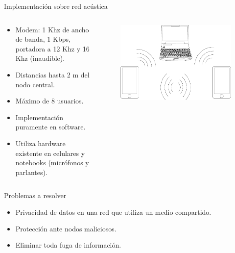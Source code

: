 \documentclass[aspectratio=169]{beamer}
\begin{document}
\begin{frame}{Implementación sobre red \color{red}acústica}

\begin{columns}
  \begin{column}{0.50\textwidth}

\begin{itemize}
 \item Modem: 1 Khz de ancho de banda, 1 Kbps, portadora a 12 Khz y 16 Khz (inaudible).
 \item Distancias hasta 2 m del nodo central.
 \item Máximo de 8 usuarios.
 \item Implementación puramente en software.
 \item Utiliza hardware existente en celulares y notebooks (micrófonos y parlantes).
 \end{itemize}

  \end{column}
  \begin{column}{0.50\textwidth}

 
\begin{figure}[t]
  \centering
  \includegraphics[width=0.85 \textwidth]{../graphs/compucelus.pdf}
\end{figure}

  \end{column}
\end{columns}

\end{frame}




\begin{frame}{Problemas a resolver}

\begin{itemize}
 \item Privacidad de datos en una red que utiliza un medio compartido.
 \item Protección ante nodos maliciosos. 
 \item Eliminar toda fuga de información.
 \end{itemize}
\end{frame}
\end{document}
